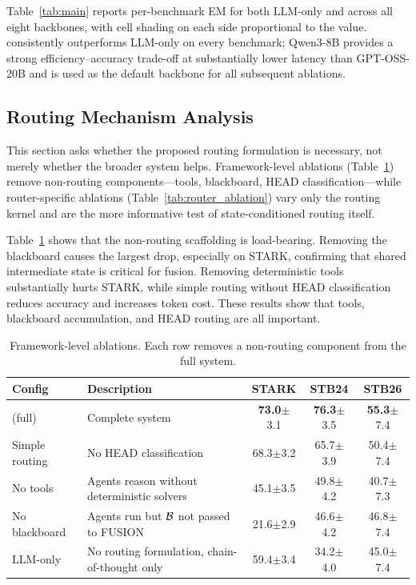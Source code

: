 Table~\ref{tab:main} reports per-benchmark EM for both LLM-only and \starname{} across all eight backbones, with cell shading on each side proportional to the value. \starname{} consistently outperforms LLM-only on every benchmark; Qwen3-8B provides a strong efficiency--accuracy trade-off at substantially lower latency than GPT-OSS-20B and is used as the default backbone for all subsequent ablations.

\subsection{Routing Mechanism Analysis}
\label{sec:router_ablation}

This section asks whether the proposed routing formulation is necessary, not merely whether the broader system helps.
Framework-level ablations (Table~\ref{tab:framework_ablation}) remove non-routing components---tools, blackboard, HEAD classification---while router-specific ablations (Table~\ref{tab:router_ablation}) vary only the routing kernel and are the more informative test of state-conditioned routing itself.

Table~\ref{tab:framework_ablation} shows that the non-routing scaffolding is load-bearing.
Removing the blackboard causes the largest drop, especially on STARK, confirming that shared intermediate state is critical for fusion.
Removing deterministic tools substantially hurts STARK, while simple routing without HEAD classification reduces accuracy and increases token cost.
These results show that tools, blackboard accumulation, and HEAD routing are all important.
\begin{table}[!htbp]
\centering
\caption{Framework-level ablations.  Each row removes a non-routing component from the full system.}
\label{tab:framework_ablation}
\small
\begin{tabular}{lp{4.5cm}ccc}
\toprule
Config & Description & STARK & STB24 & STB26 \\
\midrule
\starname{} (full)  & Complete system                                & \textbf{73.0}\tiny{$\pm$3.1} & \textbf{76.3}\tiny{$\pm$3.5} & \textbf{55.3}\tiny{$\pm$7.4} \\
Simple routing      & No HEAD classification                         & 68.3\tiny{$\pm$3.2} & 65.7\tiny{$\pm$3.9} & 50.4\tiny{$\pm$7.4} \\
No tools            & Agents reason without deterministic solvers    & 45.1\tiny{$\pm$3.5} & 49.8\tiny{$\pm$4.2} & 40.7\tiny{$\pm$7.3} \\
No blackboard       & Agents run but $\mathcal{B}$ not passed to FUSION   & 21.6\tiny{$\pm$2.9} & 46.6\tiny{$\pm$4.2} & 46.8\tiny{$\pm$7.4} \\
LLM-only            & No routing formulation, chain-of-thought only  & 59.4\tiny{$\pm$3.4} & 34.2\tiny{$\pm$4.0} & 45.0\tiny{$\pm$7.4} \\
\bottomrule
\end{tabular}
\end{table}


